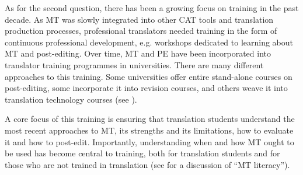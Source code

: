 \documentclass[output=paper,colorlinks,citecolor=brown]{langscibook}
\begin{document}
As for the second question, there has been a growing focus on training in the past decade. As MT was slowly integrated into other CAT tools and translation production processes, professional translators needed training in the form of continuous professional development, e.g. workshops dedicated to learning about MT and post-editing. Over time, MT and PE have been incorporated into translator training programmes in universities. There are many different approaches to this training. Some universities offer entire stand-alone courses on post-editing, some incorporate it into revision courses, and others weave it into translation technology courses (see \citealt{OBrienVázquez2019}). 

A core focus of this training is ensuring that translation students understand the most recent approaches to MT, its strengths and its limitations, how to evaluate it and how to post-edit. Importantly, understanding when and how MT ought to be used has become central to training, both for translation students and for those who are not trained in translation (see \citet{BowkerCiro2019} for a discussion of “MT literacy”).

\sloppy
\printbibliography[heading=subbibliography,notkeyword=this]
\end{document}
